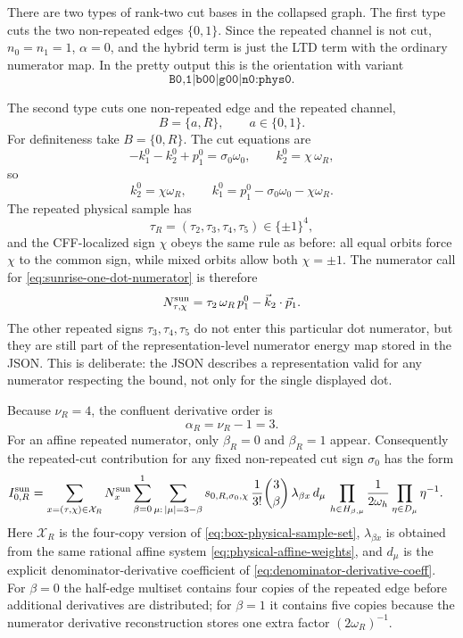 \documentclass[11pt,a4paper]{report}
\newcommand{\Samples}{\mathcal X}
\begin{document}
There are two types of rank-two cut bases in the collapsed graph.  The first
type cuts the two non-repeated edges \(\{0,1\}\).  Since the repeated channel
is not cut, \(n_0=n_1=1\), \(\alpha=0\), and the hybrid term is just the LTD
term with the ordinary numerator map.  In the pretty output this is the
orientation with variant
\[
  \texttt{B0,1|b00|g00|n0:phys0}.
\]

The second type cuts one non-repeated edge and the repeated channel,
\[
  B=\{a,R\},\qquad a\in\{0,1\}.
\]
For definiteness take \(B=\{0,R\}\).  The cut equations are
\[
  -k_1^0-k_2^0+p_1^0=\sigma_0\omega_0,\qquad
  k_2^0=\chi\,\omega_R ,
\]
so
\[
  k_2^0=\chi\omega_R,\qquad
  k_1^0=p_1^0-\sigma_0\omega_0-\chi\omega_R .
  \label{eq:sunrise-cut-map}
\]
The repeated physical sample has
\[
  \tau_R=(\tau_2,\tau_3,\tau_4,\tau_5)\in\{\pm1\}^4 ,
\]
and the CFF-localized sign \(\chi\) obeys the same rule as before: all equal
orbits force \(\chi\) to the common sign, while mixed orbits allow both
\(\chi=\pm1\).  The numerator call for
\eqref{eq:sunrise-one-dot-numerator} is therefore
\begin{equation}
  N_{\tau,\chi}^{\rm sun}
  =
  \tau_2\,\omega_R\,p_1^0-\vec k_2\cdot\vec p_1 .
  \label{eq:sunrise-physical-sample}
\end{equation}
The other repeated signs \(\tau_3,\tau_4,\tau_5\) do not enter this particular
dot numerator, but they are still part of the representation-level numerator
energy map stored in the JSON.  This is deliberate: the JSON describes a
representation valid for any numerator respecting the bound, not only for the
single displayed dot.

Because \(\nu_R=4\), the confluent derivative order is
\[
  \alpha_R=\nu_R-1=3.
\]
For an affine repeated numerator, only \(\beta_R=0\) and \(\beta_R=1\) appear.
Consequently the repeated-cut contribution for any fixed non-repeated cut
sign \(\sigma_0\) has the form
\begin{align}
  I^{\rm sun}_{0,R}
  &=
  \sum_{x=(\tau,\chi)\in\Samples_R}
  N_x^{\rm sun}
  \sum_{\beta=0}^{1}
  \sum_{\mu:\,|\mu|=3-\beta}
  s_{0,R,\sigma_0,\chi}\,
  \frac{1}{3!}\binom{3}{\beta}\,
  \lambda_{\beta x}\,
  d_\mu\,
  \prod_{h\in H_{\beta,\mu}}\frac{1}{2\omega_h}
  \prod_{\eta\in D_{\mu}}\eta^{-1}.
  \label{eq:sunrise-repeated-master}
\end{align}
Here \(\Samples_R\) is the four-copy version of
\eqref{eq:box-physical-sample-set}, \(\lambda_{\beta x}\) is obtained from the
same rational affine system \eqref{eq:physical-affine-weights}, and \(d_\mu\)
is the explicit denominator-derivative coefficient of
\eqref{eq:denominator-derivative-coeff}.  For \(\beta=0\) the half-edge
multiset contains four copies of the repeated edge before additional
derivatives are distributed; for \(\beta=1\) it contains five copies because
the numerator derivative reconstruction stores one extra factor
\((2\omega_R)^{-1}\).
\end{document}
